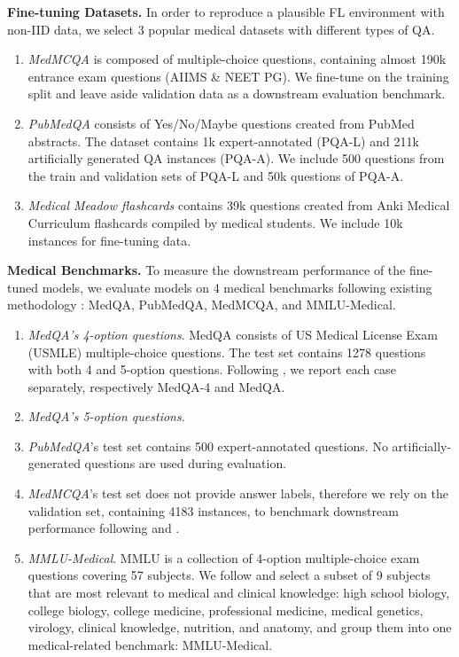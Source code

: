 \textbf{Fine-tuning Datasets.} In order to reproduce a plausible FL environment with non-IID data, we select 3 popular medical datasets with different types of QA. 
\begin{enumerate}
    \item \textit{MedMCQA} \citep{medmcqa} is composed of multiple-choice questions, containing almost 190k entrance exam questions (AIIMS \& NEET PG). We fine-tune on the training split and leave aside validation data as a downstream evaluation benchmark.
    \item \textit{PubMedQA} \citep{pubmedqa} consists of Yes/No/Maybe questions created from PubMed abstracts. The dataset contains 1k expert-annotated (PQA-L) and 211k artificially generated QA instances (PQA-A). We include 500 questions from the train and validation sets of PQA-L and 50k questions of PQA-A.
    \item \textit{Medical Meadow flashcards} \citep{medalpaca} contains 39k questions created from Anki Medical Curriculum flashcards compiled by medical students. We include 10k instances for fine-tuning data.
\end{enumerate}

\textbf{Medical Benchmarks.} To measure the downstream performance of the fine-tuned models, we evaluate models on 4 medical benchmarks following existing methodology \citep{wu2023pmcllama, singhal2023expert, singhal2023ka, meditron}: MedQA, PubMedQA, MedMCQA, and MMLU-Medical.
\begin{enumerate}
    \item \textit{MedQA's 4-option questions}. MedQA \citep{medqa} consists of US Medical License Exam (USMLE) multiple-choice questions. The test set contains 1278 questions with both 4 and 5-option questions. Following \citet{meditron}, we report each case separately, respectively MedQA-4 and MedQA.
    \item \textit{MedQA's 5-option questions}.
    \item \textit{PubMedQA}'s test set contains 500 expert-annotated questions. No artificially-generated questions are used during evaluation.
    \item \textit{MedMCQA}'s test set does not provide answer labels, therefore we rely on the validation set, containing 4183 instances, to benchmark downstream performance following \citet{wu2023pmcllama} and \citet{meditron}.
    \item \textit{MMLU-Medical}. MMLU \citep{mmlu} is a collection of 4-option multiple-choice exam questions covering 57 subjects. We follow \citet{meditron} and select a subset of 9 subjects that are most relevant to medical and clinical knowledge: high school biology, college biology, college medicine, professional medicine, medical genetics, virology, clinical knowledge, nutrition, and anatomy, and group them into one medical-related benchmark: MMLU-Medical.
\end{enumerate}

